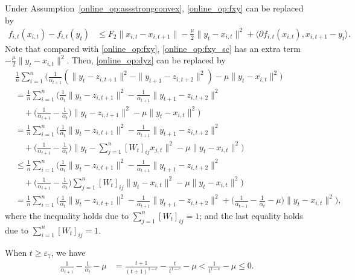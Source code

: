 \documentclass[12pt,draftcls,onecolumn]{IEEEtran}%
\begin{document}
 Under Assumption~\ref{online_op:assstrongconvex}, \eqref{online_op:fxy} can be replaced by
\begin{align}\label{online_op:fxy_sc}
f_{i,t}(x_{i,t})-f_{i,t}(y_t)
&\le F_2\|x_{i,t}-x_{i,t+1}\|-\frac{\mu}{2}\|y_t-x_{i,t}\|^2
+\langle\partial f_{i,t}(x_{i,t}),x_{i,t+1}-y_t\rangle.
\end{align}
Note that compared with \eqref{online_op:fxy}, \eqref{online_op:fxy_sc} has an extra term $-\frac{\mu}{2}\|y_t-x_{i,t}\|^2$.
Then, \eqref{online_op:dyz} can be replaced by
\begin{align}
&\frac{1}{n}\sum_{i=1}^{n}\Big(\frac{1}{\alpha_{t+1}}(\|y_t-z_{i,t+1}\|^2
-\|y_{t+1}-z_{i,t+2}\|^2)
-\mu\|y_t-x_{i,t}\|^2\Big)\nonumber\\
&=\frac{1}{n}\sum_{i=1}^{n}\Big(\frac{1}{\alpha_{t}}\|y_t-z_{i,t+1}\|^2
-\frac{1}{\alpha_{t+1}}\|y_{t+1}-z_{i,t+2}\|^2\nonumber\\
&\quad+\Big(\frac{1}{\alpha_{t+1}}-\frac{1}{\alpha_{t}}\Big)\|y_t-z_{i,t+1}\|^2
-\mu\|y_t-x_{i,t}\|^2\Big)\nonumber\\
&=\frac{1}{n}\sum_{i=1}^{n}\Big(\frac{1}{\alpha_{t}}\|y_t-z_{i,t+1}\|^2
-\frac{1}{\alpha_{t+1}}\|y_{t+1}-z_{i,t+2}\|^2\nonumber\\
&\quad+\Big(\frac{1}{\alpha_{t+1}}-\frac{1}{\alpha_{t}}\Big)
\big\|y_{t}-\sum_{j=1}^{n}[W_t]_{ij}x_{j,t}\|^2
-\mu\|y_t-x_{i,t}\|^2\Big)\nonumber\\
&\le\frac{1}{n}\sum_{i=1}^{n}\Big(\frac{1}{\alpha_{t}}\|y_t-z_{i,t+1}\|^2
-\frac{1}{\alpha_{t+1}}\|y_{t+1}-z_{i,t+2}\|^2\nonumber\\
&\quad+\Big(\frac{1}{\alpha_{t+1}}-\frac{1}{\alpha_{t}}\Big)
\sum_{j=1}^{n}[W_t]_{ij}\|y_t-x_{i,t}\|^2
-\mu\|y_t-x_{i,t}\|^2\Big)\nonumber\\
&=\frac{1}{n}\sum_{i=1}^{n}\Big(\frac{1}{\alpha_{t}}\|y_t-z_{i,t+1}\|^2
-\frac{1}{\alpha_{t+1}}\|y_{t+1}-z_{i,t+2}\|^2
+\Big(\frac{1}{\alpha_{t+1}}-\frac{1}{\alpha_{t}}-\mu\Big)
\|y_t-x_{i,t}\|^2\Big),\label{online_op:dyz_sc}
\end{align}
where the inequality holds due to $\sum_{j=1}^{n}[W_t]_{ij}=1$; and the last equality holds due to $\sum_{i=1}^{n}[W_t]_{ij}=1$.

When $t\ge\varepsilon_7$,  we have
\begin{align}\label{online_op:mu_sc}
\frac{1}{\alpha_{t+1}}
-\frac{1}{\alpha_{t}}-\mu
&=\frac{t+1}{(t+1)^{1-c}}-\frac{t}{t^{1-c}}-\mu
<\frac{1}{t^{1-c}}-\mu\le0.
\end{align}
\end{document}
